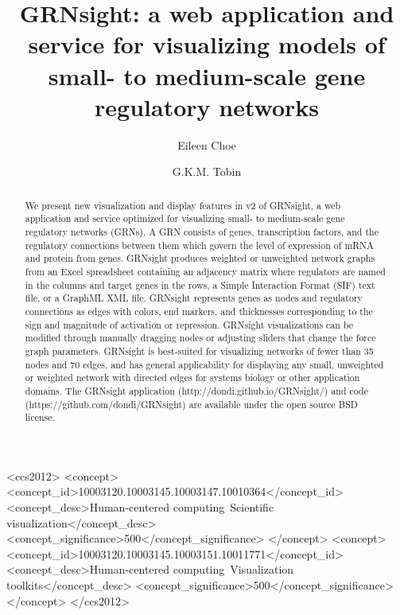 \documentclass[sigconf,review,anonymous]{acmart}
\begin{document}
\title{GRNsight: a web application and service for visualizing models of small- to medium-scale gene regulatory networks}

\author{Eileen Choe}

\author{G.K.M. Tobin}

\renewcommand{\shortauthors}{B. Trovato et. al.}

\begin{abstract}

We present new visualization and display features in v2 of GRNsight, a web application and service optimized for visualizing small- to medium-scale gene regulatory networks (GRNs). A GRN consists of genes, transcription factors, and the regulatory connections between them which govern the level of expression of mRNA and protein from genes. GRNsight produces weighted or unweighted network graphs from an Excel spreadsheet containing an adjacency matrix where regulators are named in the columns and target genes in the rows, a Simple Interaction Format (SIF) text file, or a GraphML XML file. GRNsight represents genes as nodes and regulatory connections as edges with colors, end markers, and thicknesses corresponding to the sign and magnitude of activation or repression. GRNsight visualizations can be modified through manually dragging nodes or adjusting sliders that change the force graph parameters. GRNsight is best-suited for visualizing networks of fewer than 35 nodes and 70 edges, and has general applicability for displaying any small, unweighted or weighted network with directed edges for systems biology or other application domains. The GRNsight application (http://dondi.github.io/GRNsight/) and code (https://github.com/dondi/GRNsight) are available under the open source BSD license.

\end{abstract}

%
%
\begin{CCSXML}
<ccs2012>
<concept>
<concept_id>10003120.10003145.10003147.10010364</concept_id>
<concept_desc>Human-centered computing~Scientific visualization</concept_desc>
<concept_significance>500</concept_significance>
</concept>
<concept>
<concept_id>10003120.10003145.10003151.10011771</concept_id>
<concept_desc>Human-centered computing~Visualization toolkits</concept_desc>
<concept_significance>500</concept_significance>
</concept>
</ccs2012>
\end{CCSXML}
\end{document}
